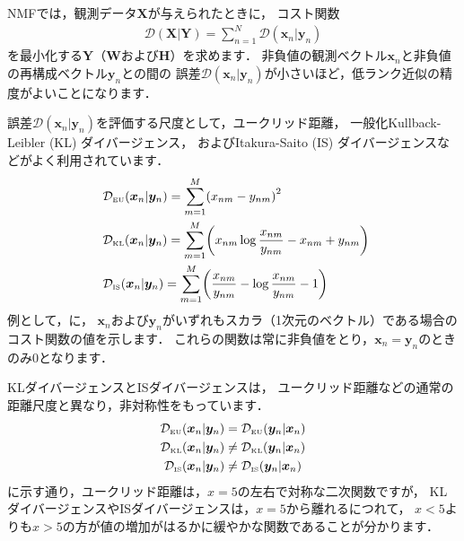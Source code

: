 NMFでは，観測データ$\bm{X}$が与えられたときに，
コスト関数
\begin{align}
\mathcal{D}(\bm{X}|\bm{Y}) = \sum_{n=1}^N \mathcal{D}(\bm{x}_n|\bm{y}_n)
\end{align}
を最小化する$\bm{Y}$（$\bm{W}$および$\bm{H}$）を求めます．
非負値の観測ベクトル$\bm{x}_n$と非負値の再構成ベクトル$\bm{y}_n$との間の
誤差$\mathcal{D}(\bm{x}_n|\bm{y}_n)$が小さいほど，低ランク近似の精度がよいことになります．

誤差$\mathcal{D}(\bm{x}_n|\bm{y}_n)$を評価する尺度として，ユークリッド距離，
一般化Kullback-Leibler (KL) ダイバージェンス\cite{smaragdis:waspaa:2003}，
およびItakura-Saito (IS) ダイバージェンス\cite{fevotte:neco:2009}などがよく利用されています．
\begin{align}
&\mathcal{D}_{\mbox{\tiny EU}}(\bm{x}_n|\bm{y}_n)
= \sum_{m=1}^M \! \left(x_{nm} - {y_{nm}}\right)^2
\!\!\!
\label{eqn:nmf_kl}
\\
&\mathcal{D}_{\mbox{\tiny KL}}(\bm{x}_n|\bm{y}_n)
= \sum_{m=1}^M \! \left(x_{nm}\log\frac{x_{nm}}{y_{nm}} - x_{nm} + {y_{nm}}\right)
\!\!\!
\label{eqn:nmf_kl}
\\
& \mathcal{D}_{\mbox{\tiny IS}}(\bm{x}_n|\bm{y}_n) 
= \sum_{m=1}^M \! \left(\frac{x_{nm}}{y_{nm}} - \log \frac{x_{nm}}{y_{nm}} - 1\right)
\!\!\!
\label{eqn:nmf_is}
\end{align}
例として，に，
$\bm{x}_n$および$\bm{y}_n$がいずれもスカラ（1次元のベクトル）である場合のコスト関数の値を示します．
これらの関数は常に非負値をとり，$\bm{x}_n = \bm{y}_n$のときのみ0となります．

KLダイバージェンスとISダイバージェンスは，
ユークリッド距離などの通常の距離尺度と異なり，非対称性をもっています．
\begin{align}
\mathcal{D}_{\mbox{\tiny EU}}(\bm{x}_n|\bm{y}_n) &=   \mathcal{D}_{\mbox{\tiny EU}}(\bm{y}_n|\bm{x}_n)\\
\mathcal{D}_{\mbox{\tiny KL}}(\bm{x}_n|\bm{y}_n) &\ne \mathcal{D}_{\mbox{\tiny KL}}(\bm{y}_n|\bm{x}_n)\\
\mathcal{D}_{\mbox{\tiny IS}}(\bm{x}_n|\bm{y}_n) &\ne \mathcal{D}_{\mbox{\tiny IS}}(\bm{y}_n|\bm{x}_n)
\end{align}
に示す通り，ユークリッド距離は，$x=5$の左右で対称な二次関数ですが，
KLダイバージェンスやISダイバージェンスは，$x=5$から離れるにつれて，
$x<5$よりも$x>5$の方が値の増加がはるかに緩やかな関数であることが分かります．

